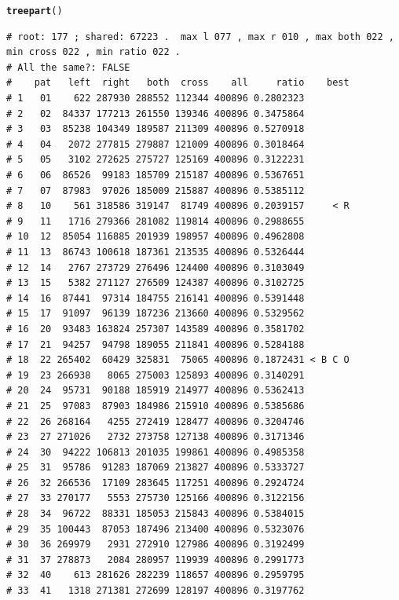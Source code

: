 \documentclass{article}\usepackage[]{graphicx}\usepackage[]{color}
\makeatletter
\newcommand{\hlstd}[1]{\textcolor[rgb]{0.345,0.345,0.345}{#1}}%
\newcommand{\hlkwd}[1]{\textcolor[rgb]{0.737,0.353,0.396}{\textbf{#1}}}%
\newenvironment{kframe}{%
 \def\at@end@of@kframe{}%
 \ifinner\ifhmode%
  \def\at@end@of@kframe{\end{minipage}}%
  \begin{minipage}{\columnwidth}%
 \fi\fi%
 \def\FrameCommand##1{\hskip\@totalleftmargin \hskip-\fboxsep
 \colorbox{shadecolor}{##1}\hskip-\fboxsep
     \hskip-\linewidth \hskip-\@totalleftmargin \hskip\columnwidth}%
 \MakeFramed {\advance\hsize-\width
   \@totalleftmargin\z@ \linewidth\hsize
   \@setminipage}}%
 {\par\unskip\endMakeFramed%
 \at@end@of@kframe}
\newenvironment{knitrout}{}{} %
\makeatother
\begin{document}
\begin{knitrout}\footnotesize
{}\color{fgcolor}\begin{kframe}
\begin{alltt}
\hlkwd{treepart}\hlstd{()}
\end{alltt}
\begin{verbatim}
# root: 177 ; shared: 67223 .  max l 077 , max r 010 , max both 022 , min cross 022 , min ratio 022 . 
# All the same?: FALSE
#    pat   left  right   both  cross    all     ratio    best
# 1   01    622 287930 288552 112344 400896 0.2802323        
# 2   02  84337 177213 261550 139346 400896 0.3475864        
# 3   03  85238 104349 189587 211309 400896 0.5270918        
# 4   04   2072 277815 279887 121009 400896 0.3018464        
# 5   05   3102 272625 275727 125169 400896 0.3122231        
# 6   06  86526  99183 185709 215187 400896 0.5367651        
# 7   07  87983  97026 185009 215887 400896 0.5385112        
# 8   10    561 318586 319147  81749 400896 0.2039157     < R
# 9   11   1716 279366 281082 119814 400896 0.2988655        
# 10  12  85054 116885 201939 198957 400896 0.4962808        
# 11  13  86743 100618 187361 213535 400896 0.5326444        
# 12  14   2767 273729 276496 124400 400896 0.3103049        
# 13  15   5382 271127 276509 124387 400896 0.3102725        
# 14  16  87441  97314 184755 216141 400896 0.5391448        
# 15  17  91097  96139 187236 213660 400896 0.5329562        
# 16  20  93483 163824 257307 143589 400896 0.3581702        
# 17  21  94257  94798 189055 211841 400896 0.5284188        
# 18  22 265402  60429 325831  75065 400896 0.1872431 < B C O
# 19  23 266938   8065 275003 125893 400896 0.3140291        
# 20  24  95731  90188 185919 214977 400896 0.5362413        
# 21  25  97083  87903 184986 215910 400896 0.5385686        
# 22  26 268164   4255 272419 128477 400896 0.3204746        
# 23  27 271026   2732 273758 127138 400896 0.3171346        
# 24  30  94222 106813 201035 199861 400896 0.4985358        
# 25  31  95786  91283 187069 213827 400896 0.5333727        
# 26  32 266536  17109 283645 117251 400896 0.2924724        
# 27  33 270177   5553 275730 125166 400896 0.3122156        
# 28  34  96722  88331 185053 215843 400896 0.5384015        
# 29  35 100443  87053 187496 213400 400896 0.5323076        
# 30  36 269979   2931 272910 127986 400896 0.3192499        
# 31  37 278873   2084 280957 119939 400896 0.2991773        
# 32  40    613 281626 282239 118657 400896 0.2959795        
# 33  41   1318 271381 272699 128197 400896 0.3197762        

\end{verbatim}
\end{kframe}
\end{knitrout}
\end{document}
